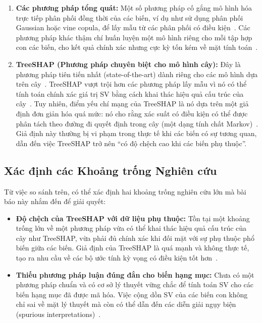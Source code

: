 \documentclass[12pt, a4paper]{article}
\begin{document}
\begin{enumerate}
    \item \textbf{Các phương pháp tổng quát:} Một số phương pháp cố gắng mô hình hóa trực tiếp phân phối đồng thời của các biến, ví dụ như sử dụng phân phối Gaussian hoặc vine copula, để lấy mẫu từ các phân phối có điều kiện~\citep{Aas2021}. Các phương pháp khác thậm chí huấn luyện một mô hình riêng cho mỗi tập hợp con các biến, cho kết quả chính xác nhưng cực kỳ tốn kém về mặt tính toán~\citep{Covert2020b}.

    \item \textbf{TreeSHAP (Phương pháp chuyên biệt cho mô hình cây):} Đây là phương pháp tiên tiến nhất (state-of-the-art) dành riêng cho các mô hình dựa trên cây~\citep{Lundberg2020, Lundberg2017}. TreeSHAP vượt trội hơn các phương pháp lấy mẫu vì nó có thể tính toán chính xác giá trị SV bằng cách khai thác hiệu quả cấu trúc của cây~\citep{Lundberg2020}. Tuy nhiên, điểm yếu chí mạng của TreeSHAP là nó dựa trên một giả định đơn giản hóa quá mức: nó cho rằng xác suất có điều kiện có thể được phân tách theo đường đi quyết định trong cây (một dạng tính chất Markov)~\citep{Chen2020, Aas2020}. Giả định này thường bị vi phạm trong thực tế khi các biến có sự tương quan, dẫn đến việc TreeSHAP trở nên ``có độ chệch cao khi các biến phụ thuộc''\citep{Aas2020}.
\end{enumerate}

\subsection{Xác định các Khoảng trống Nghiên cứu}

Từ việc so sánh trên, có thể xác định hai khoảng trống nghiên cứu lớn mà bài báo này nhắm đến để giải quyết:
\begin{itemize}
    \item \textbf{Độ chệch của TreeSHAP với dữ liệu phụ thuộc:} Tồn tại một khoảng trống lớn về một phương pháp vừa có thể khai thác hiệu quả cấu trúc của cây như TreeSHAP, vừa phải đủ chính xác khi đối mặt với sự phụ thuộc phổ biến giữa các biến. Giả định của TreeSHAP là quá mạnh và không thực tế, tạo ra nhu cầu về các bộ ước tính kỳ vọng có điều kiện tốt hơn~\citep{Aas2020}.
    \item \textbf{Thiếu phương pháp luận đúng đắn cho biến hạng mục:} Chưa có một phương pháp chuẩn và có cơ sở lý thuyết vững chắc để tính toán SV cho các biến hạng mục đã được mã hóa. Việc cộng dồn SV của các biến con không chỉ sai về mặt lý thuyết mà còn có thể dẫn đến các diễn giải ngụy biện (spurious interpretations)~\citep{Aas2020}.
\end{itemize}
\end{document}
